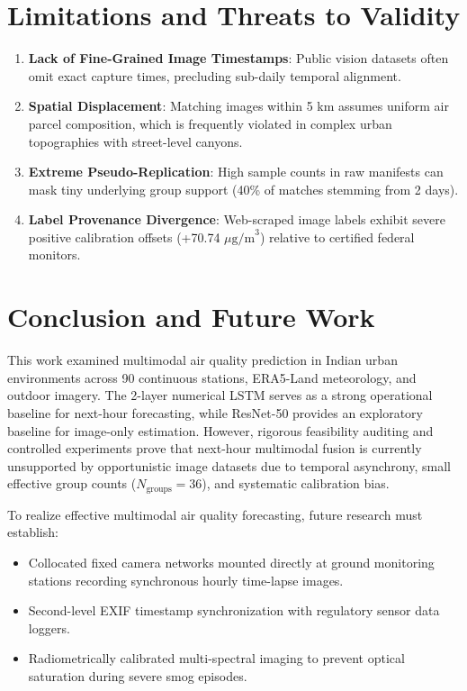 \documentclass[conference]{IEEEtran}
\begin{document}
\section{Limitations and Threats to Validity}
\begin{enumerate}
    \item \textbf{Lack of Fine-Grained Image Timestamps}: Public vision datasets often omit exact capture times, precluding sub-daily temporal alignment.
    \item \textbf{Spatial Displacement}: Matching images within 5 km assumes uniform air parcel composition, which is frequently violated in complex urban topographies with street-level canyons.
    \item \textbf{Extreme Pseudo-Replication}: High sample counts in raw manifests can mask tiny underlying group support (40\% of matches stemming from 2 days).
    \item \textbf{Label Provenance Divergence}: Web-scraped image labels exhibit severe positive calibration offsets (+70.74 $\mu\text{g/m}^3$) relative to certified federal monitors.
\end{enumerate}

\section{Conclusion and Future Work}
This work examined multimodal air quality prediction in Indian urban environments across 90 continuous stations, ERA5-Land meteorology, and outdoor imagery. The 2-layer numerical LSTM serves as a strong operational baseline for next-hour forecasting, while ResNet-50 provides an exploratory baseline for image-only estimation. However, rigorous feasibility auditing and controlled experiments prove that next-hour multimodal fusion is currently unsupported by opportunistic image datasets due to temporal asynchrony, small effective group counts ($N_{\text{groups}}=36$), and systematic calibration bias.

To realize effective multimodal air quality forecasting, future research must establish:
\begin{itemize}
    \item Collocated fixed camera networks mounted directly at ground monitoring stations recording synchronous hourly time-lapse images.
    \item Second-level EXIF timestamp synchronization with regulatory sensor data loggers.
    \item Radiometrically calibrated multi-spectral imaging to prevent optical saturation during severe smog episodes.
\end{itemize}



\end{document}
